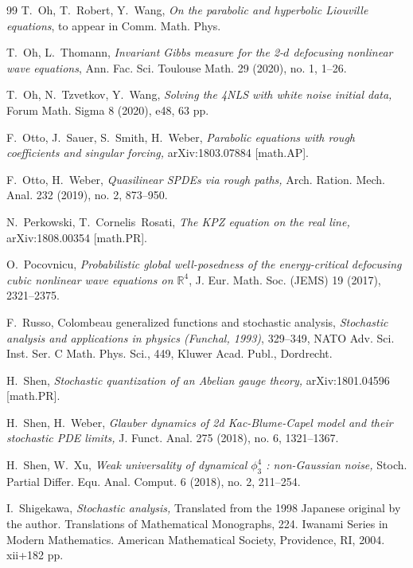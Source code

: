 \documentclass[%
11pt,  reqno]{amsart}
\newcommand{\1}{\hspace{0.2mm}\text{I}\hspace{0.2mm}}
\newcommand{\R}{\mathbb{R}}
\numberwithin{equation}{section}
\numberwithin{theorem}{section}
\begin{document}
\begin{thebibliography}{99}
T.~Oh, T.~Robert, Y.~Wang, 
{\it On the parabolic and hyperbolic Liouville equations}, 
to appear in  Comm. Math. Phys.

T.~Oh, L.~Thomann, 
{\it Invariant Gibbs measure for 
the 2-$d$ defocusing nonlinear wave  equations}, 
Ann. Fac. Sci. Toulouse Math.
 29 (2020), no. 1, 1--26. 

T.~Oh, N.~Tzvetkov, Y.~Wang,
{\it  Solving the 4NLS with white noise initial data,} 
Forum Math. Sigma 8 (2020), e48, 63 pp. 

F.~Otto, J.~Sauer, S.~Smith,  H.~Weber,
{\it Parabolic equations with rough coefficients and singular forcing,}
arXiv:1803.07884 [math.AP].

F.~Otto, H.~Weber,
{\it Quasilinear {SPDEs} via rough paths,}
 Arch. Ration. Mech. Anal. 232 (2019), no. 2, 873--950.

N.~Perkowski, T.~Cornelis~Rosati,
{\it The {KPZ} {equation} on the {real} {line},}
arXiv:1808.00354 [math.PR].


O.~Pocovnicu,
{\it Probabilistic  global well-posedness of the energy-critical defocusing  cubic nonlinear
wave equations on $\R^4$}, 
 J. Eur. Math. Soc. (JEMS) 19 (2017), 2321--2375. 




F.~Russo, 
 Colombeau generalized functions and stochastic analysis,  {\it Stochastic analysis and applications in physics (Funchal, 1993)}, 329--349, NATO Adv. Sci. Inst. Ser. C Math. Phys. Sci., 449, Kluwer Acad. Publ., Dordrecht. 

H.~Shen,
{\it Stochastic quantization of an {Abelian} gauge theory,}
arXiv:1801.04596 [math.PR].


H.~Shen, H.~Weber,
{\it Glauber dynamics of 2d {Kac}-{Blume}-{Capel} model and their
  stochastic {PDE} limits,}
 J. Funct. Anal. 275 (2018), no. 6, 1321--1367.

H.~Shen, W.~Xu,
{\it Weak universality of dynamical $\phi^4_3$ : non-{Gaussian} noise,}
 Stoch. Partial Differ. Equ. Anal. Comput. 6 (2018), no. 2, 211--254. 



I.~Shigekawa, 
{\it Stochastic analysis,}
Translated from the 1998 Japanese original by the author. Translations of Mathematical Monographs, 224. Iwanami Series in Modern Mathematics. American Mathematical Society, Providence, RI, 2004. xii+182 pp.


\end{thebibliography}
\end{document}

